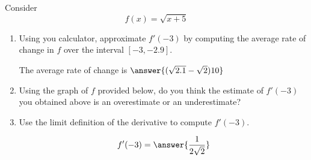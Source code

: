 \documentclass{ximera}
\author{Steven Gubkin}
\begin{document}
\begin{exercise}



Consider 
\[
f(x) = \sqrt{x+5}
\]

\begin{enumerate}
\item Using you calculator, approximate $f'(-3)$ by computing the average rate of change in $f$ over the interval $[-3,-2.9]$. \begin{prompt}   The average rate of change is  $\answer{(\sqrt{2.1}-\sqrt{2})10}$ \end{prompt}
\item Using the graph of $f$ provided below, do you think the estimate of $f'(-3)$ you obtained above is an overestimate or an underestimate?

\begin{prompt}
\begin{multipleChoice}
\end{multipleChoice}
\end{prompt}

\begin{image}
\end{image}

\item Use the limit definition of the derivative to compute $f'(-3)$.  \begin{prompt}$$f'(-3) = \answer{\frac{1}{2\sqrt{2}}}$$\end{prompt}
\end{enumerate}
\end{exercise}
\end{document}
